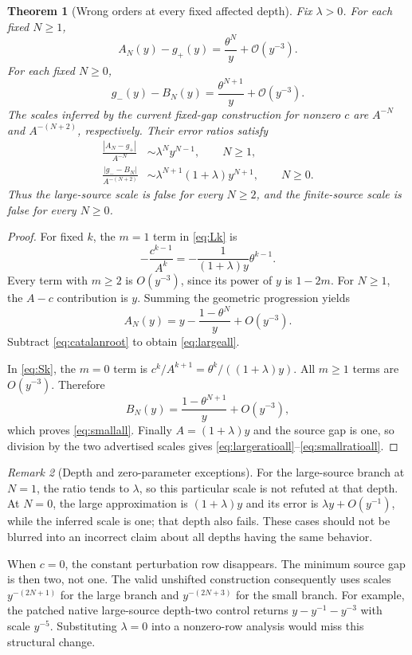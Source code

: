 \documentclass[11pt,letterpaper]{article}
\newtheorem{theorem}{Theorem}[section]
\theoremstyle{remark}\newtheorem{remark}[theorem]{Remark}
\newcommand{\OO}[1]{\mathcal O\!\left(#1\right)}
\begin{document}
\begin{theorem}[Wrong orders at every fixed affected depth]\label{thm:orders}
Fix $\lambda>0$. For each fixed $N\geq1$,
\begin{equation}\label{eq:largeall}
 A_N(y)-g_+(y)=\frac{\theta^N}{y}+\OO{y^{-3}}.
\end{equation}
For each fixed $N\geq0$,
\begin{equation}\label{eq:smallall}
 g_-(y)-B_N(y)=\frac{\theta^{N+1}}{y}+\OO{y^{-3}}.
\end{equation}
The scales inferred by the current fixed-gap construction for nonzero $c$ are
$A^{-N}$ and $A^{-(N+2)}$, respectively. Their error ratios satisfy
\begin{align}
 \frac{|A_N-g_+|}{A^{-N}}&\sim\lambda^N y^{N-1},\qquad N\geq1,\label{eq:largeratioall}\\
 \frac{|g_--B_N|}{A^{-(N+2)}}&\sim
       \lambda^{N+1}(1+\lambda)y^{N+1},\qquad N\geq0.\label{eq:smallratioall}
\end{align}
Thus the large-source scale is false for every $N\geq2$, and the finite-source
scale is false for every $N\geq0$.
\end{theorem}
\begin{proof}
For fixed $k$, the $m=1$ term in \eqref{eq:Lk} is
\[
 -\frac{c^{k-1}}{A^k}
 =-\frac1{(1+\lambda)y}\theta^{k-1}.
\]
Every term with $m\geq2$ is $O(y^{-3})$, since its power of $y$ is
$1-2m$. For $N\geq1$, the $A-c$ contribution is $y$. Summing the geometric
progression yields
\[
 A_N(y)=y-\frac{1-\theta^N}{y}+O(y^{-3}).
\]
Subtract \eqref{eq:catalanroot} to obtain \eqref{eq:largeall}.

In \eqref{eq:Sk}, the $m=0$ term is
$c^k/A^{k+1}=\theta^k/((1+\lambda)y)$. All $m\geq1$ terms are $O(y^{-3})$.
Therefore
\[
 B_N(y)=\frac{1-\theta^{N+1}}{y}+O(y^{-3}),
\]
which proves \eqref{eq:smallall}. Finally $A=(1+\lambda)y$ and the source gap
is one, so division by the two advertised scales gives
\eqref{eq:largeratioall}--\eqref{eq:smallratioall}.
\end{proof}

\begin{remark}[Depth and zero-parameter exceptions]
For the large-source branch at $N=1$, the ratio tends to $\lambda$, so this
particular scale is not refuted at that depth. At $N=0$, the large approximation
is $(1+\lambda)y$ and its error is $\lambda y+O(y^{-1})$, while the inferred
scale is one; that depth also fails. These cases should not be blurred into an
incorrect claim about all depths having the same behavior.

When $c=0$, the constant perturbation row disappears. The minimum source gap is
then two, not one. The valid unshifted construction consequently uses scales
$y^{-(2N+1)}$ for the large branch and $y^{-(2N+3)}$ for the small branch.
For example, the patched native large-source depth-two control returns
$y-y^{-1}-y^{-3}$ with scale $y^{-5}$. Substituting $\lambda=0$ into a
nonzero-row analysis would miss this structural change.
\end{remark}
\end{document}
